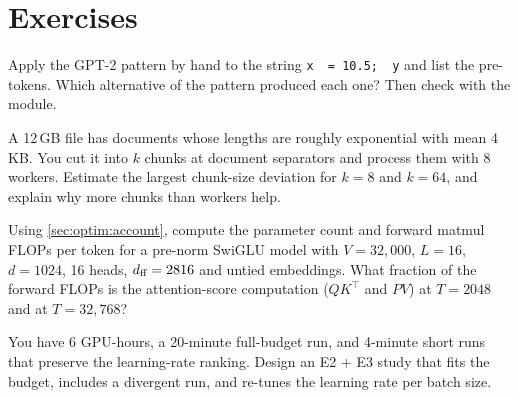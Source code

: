 \section{Exercises}

\begin{exercise}
Apply the GPT-2 pattern by hand to the string \verb*|x  = 10.5;  y| and list the pre-tokens.
Which alternative of the pattern produced each one? Then check with the  module.
\end{exercise}

\begin{exercise}
A 12\,GB file has documents whose lengths are roughly exponential with mean 4\,KB. You cut it
into $k$ chunks at document separators and process them with 8 workers. Estimate the largest
chunk-size deviation for $k=8$ and $k=64$, and explain why more chunks than workers help.
\end{exercise}

\begin{exercise}
Using \cref{sec:optim:account}, compute the parameter count and forward matmul FLOPs per token
for a pre-norm SwiGLU model with $V=32{,}000$, $L=16$, $d=1024$, 16 heads, $d_{\text{ff}}=2816$ and untied
embeddings. What fraction of the forward FLOPs is the attention-score computation ($QK^\top$ and
$PV$) at $T=2048$ and at $T=32{,}768$?
\end{exercise}

\begin{exercise}
You have 6 GPU-hours, a 20-minute full-budget run, and 4-minute short runs that preserve the
learning-rate ranking. Design an E2 + E3 study that fits the budget, includes a divergent run,
and re-tunes the learning rate per batch size.
\end{exercise}
